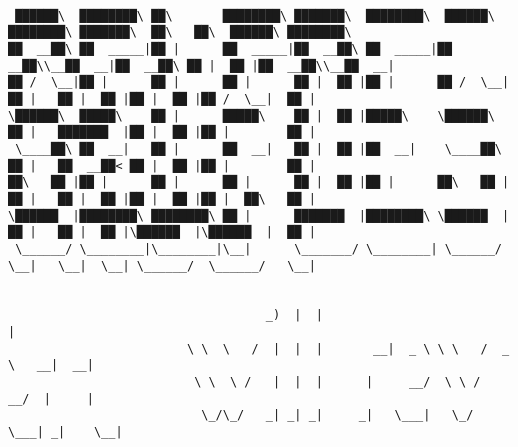 \documentclass[varwidth=\maxdimen,margin=0.5cm,multi={verbatim}]{standalone}
\begin{document}
\begin{verbatim}

 ██████\  ████████\ ██\       ████████\ ███████\  ████████\  ██████\ ████████\ ███████\  ██\   ██\  ██████\ ████████\
██  __██\ ██  _____|██ |      ██  _____|██  __██\ ██  _____|██  __██\\__██  __|██  __██\ ██ |  ██ |██  __██\\__██  __|
██ /  \__|██ |      ██ |      ██ |      ██ |  ██ |██ |      ██ /  \__|  ██ |   ██ |  ██ |██ |  ██ |██ /  \__|  ██ |
\██████\  █████\    ██ |      █████\    ██ |  ██ |█████\    \██████\    ██ |   ███████  |██ |  ██ |██ |        ██ |
 \____██\ ██  __|   ██ |      ██  __|   ██ |  ██ |██  __|    \____██\   ██ |   ██  __██< ██ |  ██ |██ |        ██ |
██\   ██ |██ |      ██ |      ██ |      ██ |  ██ |██ |      ██\   ██ |  ██ |   ██ |  ██ |██ |  ██ |██ |  ██\   ██ |
\██████  |████████\ ████████\ ██ |      ███████  |████████\ \██████  |  ██ |   ██ |  ██ |\██████  |\██████  |  ██ |
 \______/ \________|\________|\__|      \_______/ \________| \______/   \__|   \__|  \__| \______/  \______/   \__|


                                    _)  |  |                                    |
                         \ \  \   /  |  |  |       __|  _ \ \ \   /  _ \   __|  __|
                          \ \  \ /   |  |  |      |     __/  \ \ /   __/  |     |
                           \_/\_/   _| _| _|     _|   \___|   \_/  \___| _|    \__|



\end{verbatim}
\end{document}
